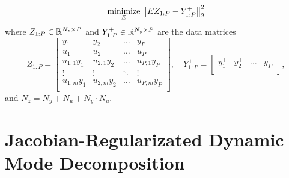 \documentclass{article}
\begin{document}
\begin{align} \label{opt:edmd}
  \underset{E}{\text{minimize}} \; \norm{E Z_{1:P} - Y_{1:P}^+}_2^2
\end{align}
where $Z_{1:P} \in \mathbb{R}^{N_z \times P}$ and $Y_{1:P}^+ \in \mathbb{R}^{N_y \times P}$ are the data 
matrices 
\begin{equation}
  Z_{1:P} = \begin{bmatrix}
    y_1         & y_2         & \dots  & y_P          \\
    u_1         & u_2         & \dots  & u_P          \\
    u_{1,1} y_1 & u_{2,1} y_2 & \dots  & u_{P,1} y_P  \\
    \vdots      & \vdots      & \ddots & \vdots       \\
    u_{1,m} y_1 & u_{2,m} y_2 & \dots  & u_{P,m} y_P  \\
  \end{bmatrix}, \quad 
  Y_{1:P}^+ = \begin{bmatrix}
    y_1^+         & y_2^+         & \dots  & y_P^+    \\
  \end{bmatrix},
\end{equation}
and $N_z = N_y + N_u + N_y \cdot N_u$.


\section{Jacobian-Regularizated Dynamic Mode Decomposition} \label{sec:jdmd}
\end{document}

